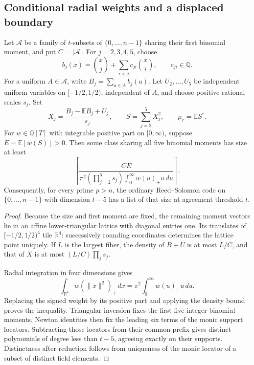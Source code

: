 \subsection{Conditional radial weights and a displaced boundary}
\label{sec:overnight-weights}
\begin{proposition}
Let $\mathcal A$ be a family of $t$-subsets of
$\{0,\ldots,n-1\}$ sharing their first binomial moment, and put
$C=|\mathcal A|$. For $j=2,3,4,5$, choose
\[
 b_j(x)=\binom{x}{j}+\sum_{i<j}c_{ji}\binom{x}{i},
 \qquad c_{ji}\in\mathbb Q.
\]
For a uniform $A\in\mathcal A$, write
$B_j=\sum_{a\in A}b_j(a)$. Let $U_2,\ldots,U_5$ be independent
uniform variables on $[-1/2,1/2)$, independent of $A$, and choose
positive rational scales $s_j$. Set
\[
 X_j=\frac{B_j-\mathbb EB_j+U_j}{s_j},\qquad
 S=\sum_{j=2}^5X_j^2,\qquad \mu_r=\mathbb ES^r.
\]
For $w\in\mathbb Q[T]$ with integrable positive part on $[0,\infty)$,
suppose $E=\mathbb E[w(S)]>0$. Then some class sharing all five
binomial moments has size at least
\[
 \left\lceil
 \frac{CE}{\pi^2(\prod_{j=2}^5s_j)
       \int_0^\infty w(u)_+u\,du}
 \right\rceil.
\]
Consequently, for every prime $p>n$, the ordinary Reed--Solomon code
on $\{0,\ldots,n-1\}$ with dimension $t-5$ has a list of that size
at agreement threshold $t$.
\end{proposition}

\begin{proof}
Because the size and first moment are fixed, the remaining moment vectors
lie in an affine lower-triangular lattice with diagonal entries one.
Its translates of $[-1/2,1/2)^4$ tile $\mathbb R^4$: successively
rounding coordinates determines the lattice point uniquely. If $L$ is
the largest fiber, the density of $B+U$ is at most $L/C$, and that of
$X$ is at most $(L/C)\prod_js_j$.

Radial integration in four dimensions gives
\[
 \int_{\mathbb R^4}
  w(\|x\|^2)_+\,dx
 =\pi^2\int_0^\infty w(u)_+u\,du.
\]
Replacing the signed weight by its positive part and applying the density
bound proves the inequality. Triangular inversion fixes the first five
integer binomial moments. Newton identities then fix the leading six
terms of the monic support locators. Subtracting those locators from
their common prefix gives distinct polynomials of degree less than
$t-5$, agreeing exactly on their supports. Distinctness after reduction
follows from uniqueness of the monic locator of a subset of distinct
field elements.
\end{proof}

